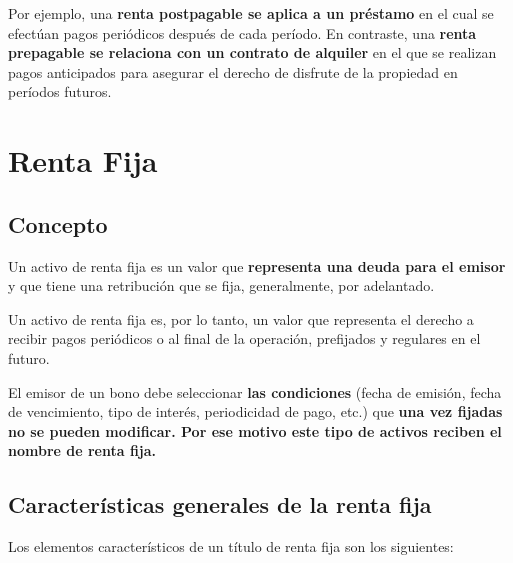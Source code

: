 \documentclass[
  letterpaper,
  DIV=11,
  numbers=noendperiod]{scrartcl}
\begin{document}
Por ejemplo, una \textbf{renta postpagable se aplica a un préstamo} en
el cual se efectúan pagos periódicos después de cada período. En
contraste, una \textbf{renta prepagable se relaciona con un contrato de
alquiler} en el que se realizan pagos anticipados para asegurar el
derecho de disfrute de la propiedad en períodos futuros.

\hypertarget{renta-fija}{%
\section{Renta Fija}\label{renta-fija}}

\hypertarget{concepto-1}{%
\subsection{Concepto}\label{concepto-1}}

Un activo de renta fija es un valor que \textbf{representa una deuda
para el emisor} y que tiene una retribución que se fija, generalmente,
por adelantado.

Un activo de renta fija es, por lo tanto, un valor que representa el
derecho a recibir pagos periódicos o al final de la operación,
prefijados y regulares en el futuro.

El emisor de un bono debe seleccionar \textbf{las condiciones} (fecha de
emisión, fecha de vencimiento, tipo de interés, periodicidad de pago,
etc.) que \textbf{una vez fijadas no se pueden modificar. Por ese motivo
este tipo de activos reciben el nombre de renta fija.}

\hypertarget{caracteruxedsticas-generales-de-la-renta-fija}{%
\subsection{Características generales de la renta
fija}\label{caracteruxedsticas-generales-de-la-renta-fija}}

Los elementos característicos de un título de renta fija son los
siguientes:
\end{document}
